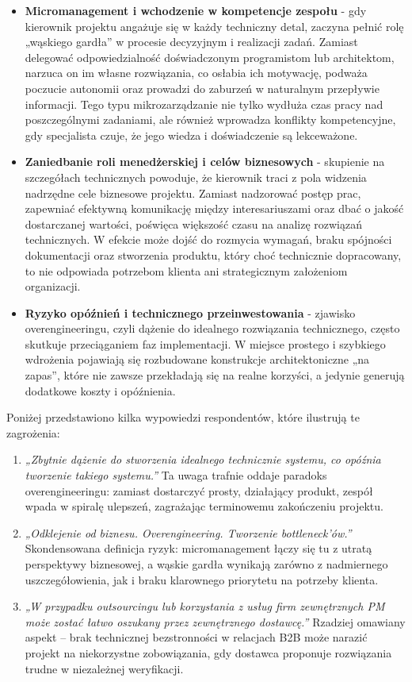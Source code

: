 \begin{itemize}
  \item \textbf{Micromanagement i wchodzenie w kompetencje zespołu} - gdy kierownik projektu angażuje się w każdy techniczny detal, zaczyna pełnić rolę „wąskiego gardła” w procesie decyzyjnym i realizacji zadań. Zamiast delegować odpowiedzialność doświadczonym programistom lub architektom, narzuca on im własne rozwiązania, co osłabia ich motywację, podważa poczucie autonomii oraz prowadzi do zaburzeń w naturalnym przepływie informacji. Tego typu mikrozarządzanie nie tylko wydłuża czas pracy nad poszczególnymi zadaniami, ale również wprowadza konflikty kompetencyjne, gdy specjalista czuje, że jego wiedza i doświadczenie są lekceważone.
  \item \textbf{Zaniedbanie roli menedżerskiej i celów biznesowych} - skupienie na szczegółach technicznych powoduje, że kierownik traci z pola widzenia nadrzędne cele biznesowe projektu. Zamiast nadzorować postęp prac, zapewniać efektywną komunikację między interesariuszami oraz dbać o jakość dostarczanej wartości, poświęca większość czasu na analizę rozwiązań technicznych. W efekcie może dojść do rozmycia wymagań, braku spójności dokumentacji oraz stworzenia produktu, który choć technicznie dopracowany, to nie odpowiada potrzebom klienta ani strategicznym założeniom organizacji.
  \item \textbf{Ryzyko opóźnień i technicznego przeinwestowania} - zjawisko overengineeringu, czyli dążenie do idealnego rozwiązania technicznego\autocite{overengineering}, często skutkuje przeciąganiem faz implementacji. W miejsce prostego i szybkiego wdrożenia pojawiają się rozbudowane konstrukcje architektoniczne „na zapas”, które nie zawsze przekładają się na realne korzyści, a jedynie generują dodatkowe koszty i opóźnienia.
\end{itemize}

Poniżej przedstawiono kilka wypowiedzi respondentów, które ilustrują te zagrożenia:

\begin{enumerate}
  \item \emph{„Zbytnie dążenie do stworzenia idealnego technicznie systemu, co opóźnia tworzenie takiego systemu.”}  
  Ta uwaga trafnie oddaje paradoks overengineeringu: zamiast dostarczyć prosty, działający produkt, zespół wpada w spiralę ulepszeń, zagrażając terminowemu zakończeniu projektu.
  
  \item \emph{„Odklejenie od biznesu. Overengineering. Tworzenie \emph{bottleneck}’ów.”}  
  Skondensowana definicja ryzyk: micromanagement łączy się tu z utratą perspektywy biznesowej, a wąskie gardła wynikają zarówno z nadmiernego uszczegółowienia, jak i braku klarownego priorytetu na potrzeby klienta.
  
  \item \emph{„W przypadku outsourcingu lub korzystania z usług firm zewnętrznych PM może zostać łatwo oszukany przez zewnętrznego dostawcę.”}  
  Rzadziej omawiany aspekt – brak technicznej bezstronności w relacjach B2B może narazić projekt na niekorzystne zobowiązania, gdy dostawca proponuje rozwiązania trudne w niezależnej weryfikacji.
\end{enumerate}

